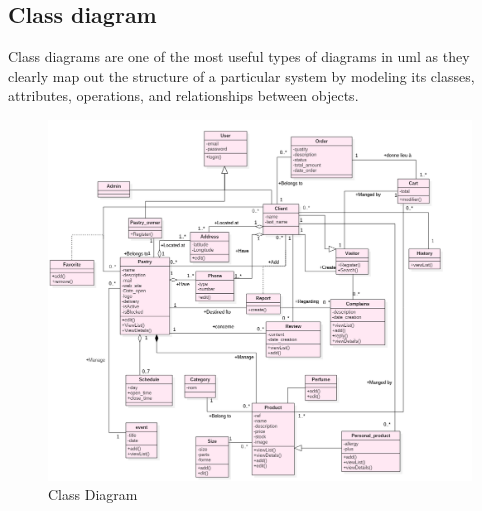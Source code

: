 \documentclass[12pt,a4paper]{report}
\begin{document}
	\subsection{Class diagram}
	Class diagrams are one of the most useful types of diagrams in \ac{uml} as they clearly map out the structure of a particular system by modeling its classes, attributes, operations, and relationships between objects.
	
	
	
	\vspace*{2cm}
	\begin{figure}[H]
		\centering
		\includegraphics[width=7.7in,keepaspectratio]{class.png}
		\caption{Class Diagram}
	\end{figure}
	
\end{document}
